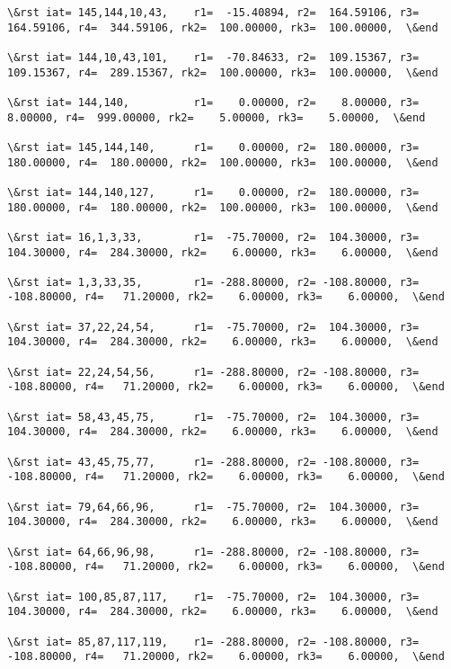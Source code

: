 \documentclass[11pt]{article}
\begin{document}
\begin{Verbatim}[commandchars=\\\{\}]
\&rst iat= 145,144,10,43,    r1=  -15.40894, r2=  164.59106, r3=  164.59106, r4=  344.59106, rk2=  100.00000, rk3=  100.00000,  \&end

\&rst iat= 144,10,43,101,    r1=  -70.84633, r2=  109.15367, r3=  109.15367, r4=  289.15367, rk2=  100.00000, rk3=  100.00000,  \&end

\&rst iat= 144,140,          r1=    0.00000, r2=    8.00000, r3=    8.00000, r4=  999.00000, rk2=    5.00000, rk3=    5.00000,  \&end

\&rst iat= 145,144,140,      r1=    0.00000, r2=  180.00000, r3=  180.00000, r4=  180.00000, rk2=  100.00000, rk3=  100.00000,  \&end

\&rst iat= 144,140,127,      r1=    0.00000, r2=  180.00000, r3=  180.00000, r4=  180.00000, rk2=  100.00000, rk3=  100.00000,  \&end

\&rst iat= 16,1,3,33,        r1=  -75.70000, r2=  104.30000, r3=  104.30000, r4=  284.30000, rk2=    6.00000, rk3=    6.00000,  \&end

\&rst iat= 1,3,33,35,        r1= -288.80000, r2= -108.80000, r3= -108.80000, r4=   71.20000, rk2=    6.00000, rk3=    6.00000,  \&end

\&rst iat= 37,22,24,54,      r1=  -75.70000, r2=  104.30000, r3=  104.30000, r4=  284.30000, rk2=    6.00000, rk3=    6.00000,  \&end

\&rst iat= 22,24,54,56,      r1= -288.80000, r2= -108.80000, r3= -108.80000, r4=   71.20000, rk2=    6.00000, rk3=    6.00000,  \&end

\&rst iat= 58,43,45,75,      r1=  -75.70000, r2=  104.30000, r3=  104.30000, r4=  284.30000, rk2=    6.00000, rk3=    6.00000,  \&end

\&rst iat= 43,45,75,77,      r1= -288.80000, r2= -108.80000, r3= -108.80000, r4=   71.20000, rk2=    6.00000, rk3=    6.00000,  \&end

\&rst iat= 79,64,66,96,      r1=  -75.70000, r2=  104.30000, r3=  104.30000, r4=  284.30000, rk2=    6.00000, rk3=    6.00000,  \&end

\&rst iat= 64,66,96,98,      r1= -288.80000, r2= -108.80000, r3= -108.80000, r4=   71.20000, rk2=    6.00000, rk3=    6.00000,  \&end

\&rst iat= 100,85,87,117,    r1=  -75.70000, r2=  104.30000, r3=  104.30000, r4=  284.30000, rk2=    6.00000, rk3=    6.00000,  \&end

\&rst iat= 85,87,117,119,    r1= -288.80000, r2= -108.80000, r3= -108.80000, r4=   71.20000, rk2=    6.00000, rk3=    6.00000,  \&end


\end{Verbatim}
\end{document}
